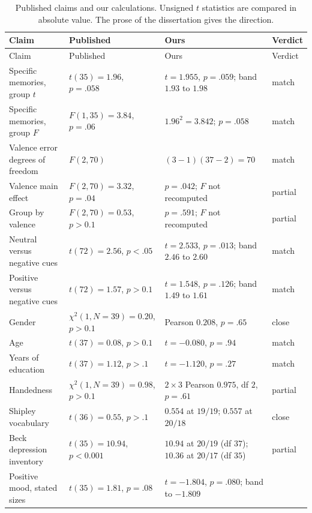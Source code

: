 \documentclass[11pt]{article}
\begin{document}
\begin{footnotesize}
\begin{longtable}{@{}L{0.22\textwidth}L{0.24\textwidth}L{0.32\textwidth}L{0.12\textwidth}@{}}
\caption{Published claims and our calculations.
Unsigned \(t\) statistics are compared in absolute value.
The prose of the dissertation gives the direction.}
\label{tab:compare}\\
\toprule
Claim & Published & Ours & Verdict \\
\midrule
\endfirsthead
\toprule
Claim & Published & Ours & Verdict \\
\midrule
\endhead
Specific memories, group \(t\) &
\(t(35)=1.96\), \(p=.058\) &
\(t=1.955\), \(p=.059\); band \(1.93\) to \(1.98\) &
match \\
Specific memories, group \(F\) &
\(F(1,35)=3.84\), \(p=.06\) &
\(1.96^2=3.842\); \(p=.058\) &
match \\
Valence error degrees of freedom &
\(F(2,70)\) &
\((3-1)(37-2)=70\) &
match \\
Valence main effect &
\(F(2,70)=3.32\), \(p=.04\) &
\(p=.042\); \(F\) not recomputed &
partial \\
Group by valence &
\(F(2,70)=0.53\), \(p>0.1\) &
\(p=.591\); \(F\) not recomputed &
partial \\
Neutral versus negative cues &
\(t(72)=2.56\), \(p<.05\) &
\(t=2.533\), \(p=.013\); band \(2.46\) to \(2.60\) &
match \\
Positive versus negative cues &
\(t(72)=1.57\), \(p>0.1\) &
\(t=1.548\), \(p=.126\); band \(1.49\) to \(1.61\) &
match \\
Gender &
\(\chi^2(1,N=39)=0.20\), \(p>0.1\) &
Pearson \(0.208\), \(p=.65\) &
close \\
Age &
\(t(37)=0.08\), \(p>0.1\) &
\(t=-0.080\), \(p=.94\) &
match \\
Years of education &
\(t(37)=1.12\), \(p>.1\) &
\(t=-1.120\), \(p=.27\) &
match \\
Handedness &
\(\chi^2(1,N=39)=0.98\), \(p>0.1\) &
\(2\times 3\) Pearson \(0.975\), df \(2\), \(p=.61\) &
partial \\
Shipley vocabulary &
\(t(36)=0.55\), \(p>.1\) &
\(0.554\) at \(19/19\); \(0.557\) at \(20/18\) &
close \\
Beck depression inventory &
\(t(35)=10.94\), \(p<0.001\) &
\(10.94\) at \(20/19\) (df \(37\)); \(10.36\) at \(20/17\) (df \(35\)) &
partial \\
Positive mood, stated sizes &
\(t(35)=1.81\), \(p=.08\) &
\(t=-1.804\), \(p=.080\); band to \(-1.809\) &

\end{longtable}
\end{footnotesize}
\end{document}
